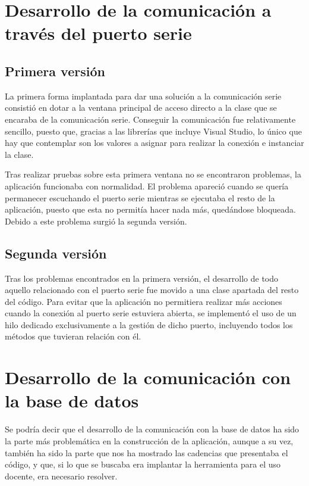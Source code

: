 \section{Desarrollo de la comunicación a través del puerto serie}

\subsection{Primera versión}

La primera forma implantada para dar una solución a la comunicación serie consistió en dotar a la ventana principal de acceso directo a la clase que se encaraba de la comunicación serie. Conseguir la comunicación fue relativamente sencillo, puesto que, gracias a las librerías que incluye Visual Studio, lo único que hay que contemplar son los valores a asignar para realizar la conexión e instanciar la clase.

Tras realizar pruebas sobre esta primera ventana no se encontraron problemas, la aplicación funcionaba con normalidad. El problema apareció cuando se quería permanecer escuchando el puerto serie mientras se ejecutaba el resto de la aplicación, puesto que esta no permitía hacer nada más, quedándose bloqueada. Debido a este problema surgió la segunda versión.

\subsection{Segunda versión}

Tras los problemas encontrados en la primera versión, el desarrollo de todo aquello relacionado con el puerto serie fue movido a una clase apartada del resto del código. Para evitar que la aplicación no permitiera realizar más acciones cuando la conexión al puerto serie estuviera abierta, se implementó el uso de un hilo dedicado exclusivamente a la gestión de dicho puerto, incluyendo todos los métodos que tuvieran relación con él.

\section{Desarrollo de la comunicación con la base de datos}

Se podría decir que el desarrollo de la comunicación con la base de datos ha sido la parte más problemática en la construcción de la aplicación, aunque a su vez, también ha sido la parte que nos ha mostrado las cadencias que presentaba el código, y que, si lo que se buscaba era implantar la herramienta para el uso docente, era necesario resolver.

